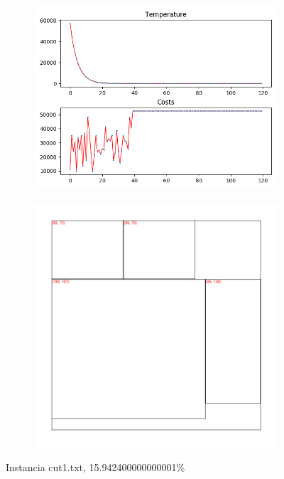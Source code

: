 \begin{figure}
\centering
\begin{subfigure}{.5\textwidth}
  \centering
  \includegraphics[width=1\linewidth]{results/cut1/3/plot}
  \label{fig:sub1}
\end{subfigure}%
\begin{subfigure}{.5\textwidth}
  \centering
  \includegraphics[width=1\linewidth]{results/cut1/3/cut}
  \label{fig:sub2}
\end{subfigure}
\caption{Instancia cut1.txt, 15.942400000000001\%}
\label{fig:test}
\end{figure}


